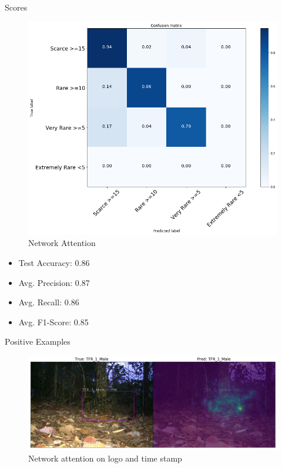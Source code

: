 \documentclass[10pt]{beamer}
\begin{document}
\begin{frame}{Scores}
	\centering
	\begin{minipage}[c]{0.58\linewidth}
		\begin{figure}
			\includegraphics[width=\columnwidth]{images/conf_mat_leo_retina.png}
			\caption{Network Attention}
		\end{figure}
	\end{minipage}
	\begin{minipage}[c]{0.38\linewidth}
		\begin{itemize}
			\item Test Accuracy: 0.86
			\item Avg. Precision:  0.87
			\item Avg. Recall: 0.86
			\item Avg. F1-Score: 0.85
		\end{itemize}
	\end{minipage}
\end{frame}

\begin{frame}{Positive Examples}
	\centering
	\begin{figure}
		\includegraphics[width=\columnwidth]{images/RetinaNet_Attention_correct_good_quality2.png}
		\caption{Network attention on logo and time stamp}
	\end{figure}
\end{frame}
\end{document}
